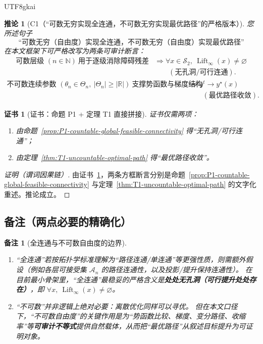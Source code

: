 \documentclass[12pt]{article}
\newtheorem{corollary}{推论}[section]
\newtheorem{remark}{备注}[section]
\newtheorem{Certificate}{证书}[section]
\newcommand{\Lift}{\operatorname{Lift}}
\begin{document}
\begin{CJK*}{UTF8}{gkai}
\begin{corollary}[C1（“可数无穷实现全连通，不可数无穷实现最优路径”的严格版本）]\label{cor:C1-two-infinities-slogan}
您所述句子
\[
\text{“可数无穷（自由度）实现全连通，不可数无穷（自由度）实现最优路径”}
\]
在本文框架下可严格改写为两条可审计断言：
\[
\boxed{
\begin{aligned}
\text{可数层级 }(n\in\mathbb N)\ \text{用于逐级消除障碍残差}
&\Rightarrow
\forall x\in\mathcal S_2,\ \Lift_\infty(x)\neq\varnothing\\
&\qquad(\text{无孔洞/可行连通}).
\end{aligned}
}
\]
\[
\boxed{
\begin{aligned}
\text{不可数连续参数 }(\theta_n\in\Theta_n,\ |\Theta_n|\ge|\mathbb R|)\ \text{支撑势函数与梯度结构}
&\Rightarrow
y^t\to y^\star(x)\\
&\qquad(\text{最优路径收敛}).
\end{aligned}
}
\]
\end{corollary}

\begin{Certificate}[证书：命题 P1 + 定理 T1 直接拼接]\label{cert:C1-two-infinities-slogan}
证书仅需两项：
\begin{enumerate}
\item 由命题~\ref{prop:P1-countable-global-feasible-connectivity} 得“无孔洞/可行连通”；
\item 由定理~\ref{thm:T1-uncountable-optimal-path} 得“最优路径收敛”。
\end{enumerate}
\end{Certificate}

\begin{proof}[证明（谓词因果链）]
由证书~\ref{cert:C1-two-infinities-slogan}，两条方框断言分别是命题~\ref{prop:P1-countable-global-feasible-connectivity} 与定理~\ref{thm:T1-uncountable-optimal-path} 的文字化重述。推论成立。
\end{proof}

\subsection{备注（两点必要的精确化）}

\begin{remark}[全连通与不可数自由度的边界]\label{rem:two-infinities-precision}
\begin{enumerate}
\item “全连通”若按拓扑学标准理解为“路径连通/单连通”等更强性质，则需额外假设（例如各层可接受集 $\mathcal A_n$ 的路径连通性，以及投影/提升保持连通性）。
在目前最小骨架里，“全连通”最稳妥的严格含义是\textbf{处处无孔洞（可行提升处处存在）}，即 $\forall x,\ \Lift_\infty(x)\neq\varnothing$。
\item “不可数”并非逻辑上绝对必要：离散优化同样可以寻优。
但在本文口径下，“不可数自由度”的关键作用是为“势函数比较、梯度、变分路径、收缩率”等\textbf{可审计不等式}提供自然载体，从而把“最优路径”从叙述目标提升为可证明对象。
\end{enumerate}
\end{remark}


\end{CJK*}
\end{document}
